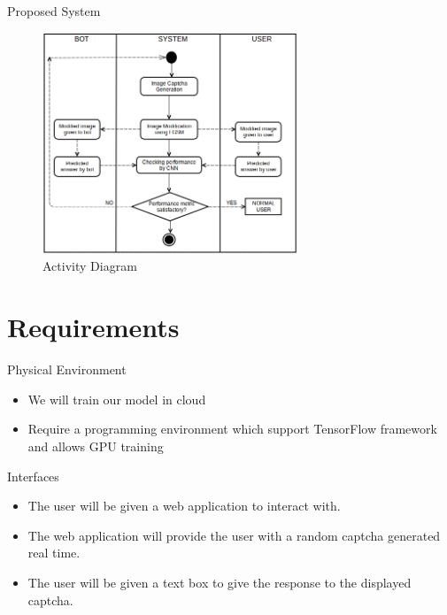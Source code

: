 \documentclass[10pt]{beamer}
\begin{document}
\begin{frame}{Proposed System}
\begin{figure}
    \centering
    \includegraphics[width=3in]{activity.png}
    \caption{Activity Diagram}
\end{figure}
\end{frame}

\section{Requirements}

\begin{frame}{Physical Environment}
	\begin{itemize}
	    
	    \item We will train our model in cloud
	    
	    \item Require a programming environment which support TensorFlow framework and allows GPU training
	    
	   
	    
	\end{itemize}
\end{frame}

\begin{frame}{Interfaces}
	\begin{itemize}
	    
	    \item The user will be given a web application to interact with.
	    
	    \item The web application will provide the user with a random captcha generated real time.
	    
	    \item The user will be given a text box to give the response to the displayed captcha. 
	    
	\end{itemize}
\end{frame}
\end{document}
